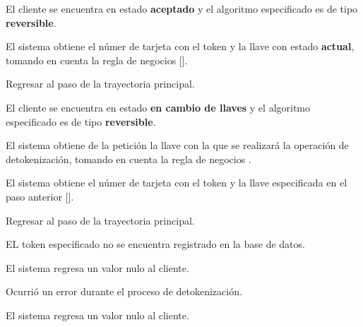 {\begin{trayectoriaAlternativa}
  \end{trayectoriaAlternativa}

  \begin{trayectoriaAlternativa}
    {El cliente se encuentra en estado \textbf{aceptado} y el algoritmo
    especificado es de tipo \textbf{reversible}.}

    \item El sistema obtiene el númer de tarjeta con el token y la llave
      con estado \textbf{actual}, tomando en cuenta la regla de negocios
      [].

    \item Regresar al paso  de la trayectoria
      principal.

  \end{trayectoriaAlternativa}

  \begin{trayectoriaAlternativa}
    {El cliente se encuentra en estado \textbf{en cambio de llaves} y el
    algoritmo especificado es de tipo \textbf{reversible}.}

    \item El sistema obtiene de la petición la llave con la que se realizará
      la operación de detokenización, tomando en cuenta la regla de negocios
      .

    \item El sistema obtiene el númer de tarjeta con el token y la llave
      especificada en el paso anterior
      [].

    \item Regresar al paso  de la trayectoria
      principal.

  \end{trayectoriaAlternativa}

  \begin{trayectoriaAlternativa}
    {EL token especificado no se encuentra registrado en la base de datos.}

    \item El sistema regresa un valor nulo al cliente.

  \end{trayectoriaAlternativa}

  \begin{trayectoriaAlternativa}
    {Ocurrió un error durante el proceso de detokenización.}

    \item El sistema regresa un valor nulo al cliente.

  \end{trayectoriaAlternativa}
}
